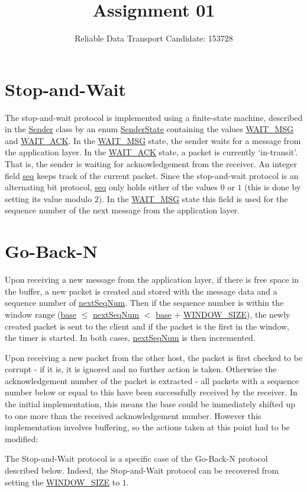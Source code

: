 \documentclass[a4paper]{article}
\title{\vspace{-5ex}Assignment 01}
\author{{Reliable Data Transport \hspace{1cm} Candidate: 153728}}
\date{}
\newcommand{\code}{\url}
\begin{document}
\maketitle
\vspace{-4ex}

\section{Stop-and-Wait}

The stop-and-wait protocol is implemented using a finite-state machine, described in the \code{Sender} class by an enum \code{SenderState} containing the values \code{WAIT_MSG} and \code{WAIT_ACK}. In the \code{WAIT_MSG} state, the sender waits for a message from the application layer. In the \code{WAIT_ACK} state, a packet is currently `in-transit'. That is, the sender is waiting for acknowledgement from the receiver. An integer field \code{seq} keeps track of the current packet. Since the stop-and-wait protocol is an alternating bit protocol, \code{seq} only holds either of the values $0$ or $1$ (this is done by setting its value modulo $2$). In the \code{WAIT_MSG} state this field is used for the sequence number of the next message from the application layer. 


\section{Go-Back-N}

Upon receiving a new message from the application layer, if there is free space in the buffer, a new packet is created and stored with the message data and a sequence number of \code{nextSeqNum}. Then if the sequence number is within the window range (\code{base} $\leq$ \code{nextSeqNum} $<$ \code{base} + \code{WINDOW_SIZE}), the newly created packet is sent to the client and if the packet is the first in the window, the timer is started. In both cases, \code{nextSeqNum} is then incremented.

Upon receiving a new packet from the other host, the packet is first checked to be corrupt - if it is, it is ignored and no further action is taken. Otherwise the acknowledgement number of the packet is extracted - all packets with a sequence number below or equal to this have been successfully received by the receiver. In the initial implementation, this means the base could be immediately shifted up to one more than the received acknowledgement number. However this implementation involves buffering, so the actions taken at this point had to be modified:

The Stop-and-Wait protocol is a specific case of the Go-Back-N protocol described below. Indeed, the Stop-and-Wait protocol can be recovered from setting the \code{WINDOW_SIZE} to $1$.
\end{document}
